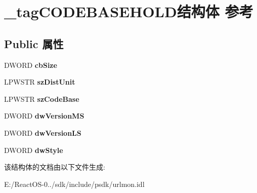 \hypertarget{struct__tag_c_o_d_e_b_a_s_e_h_o_l_d}{}\section{\+\_\+tag\+C\+O\+D\+E\+B\+A\+S\+E\+H\+O\+L\+D结构体 参考}
\label{struct__tag_c_o_d_e_b_a_s_e_h_o_l_d}
\subsection*{Public 属性}
\begin{DoxyCompactItemize}
\item 
\mbox{\label{struct__tag_c_o_d_e_b_a_s_e_h_o_l_d_a1c53a98a8f54b7dd988c59702efd4afb}} 
D\+W\+O\+RD {\bfseries cb\+Size}
\item 
\mbox{\label{struct__tag_c_o_d_e_b_a_s_e_h_o_l_d_abdee7e6ca09873034872fab7835955ae}} 
L\+P\+W\+S\+TR {\bfseries sz\+Dist\+Unit}
\item 
\mbox{\label{struct__tag_c_o_d_e_b_a_s_e_h_o_l_d_a40d0fb59b572d8dd470ad4e53f60ca77}} 
L\+P\+W\+S\+TR {\bfseries sz\+Code\+Base}
\item 
\mbox{\label{struct__tag_c_o_d_e_b_a_s_e_h_o_l_d_a216f9625587d44a69b661df9d65331a7}} 
D\+W\+O\+RD {\bfseries dw\+Version\+MS}
\item 
\mbox{\label{struct__tag_c_o_d_e_b_a_s_e_h_o_l_d_a7cefda8276b931011bf28b52243beb17}} 
D\+W\+O\+RD {\bfseries dw\+Version\+LS}
\item 
\mbox{\label{struct__tag_c_o_d_e_b_a_s_e_h_o_l_d_ae60d3bf7f90259e4d6346bf603cc2589}} 
D\+W\+O\+RD {\bfseries dw\+Style}
\end{DoxyCompactItemize}


该结构体的文档由以下文件生成\+:\begin{DoxyCompactItemize}
\item 
E\+:/\+React\+O\+S-\/0../sdk/include/psdk/urlmon.\+idl\end{DoxyCompactItemize}
